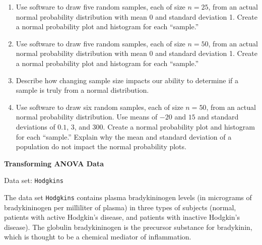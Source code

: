 \documentclass[
]{report}
\begin{document}
\begin{list}{E..}{ \setlength{\itemsep}{1.2em}}
    \begin{enumerate}
      \item Use software to draw five random samples, each of size $n = 25$, from an actual normal probability distribution with mean 0 and standard deviation 1. Create a normal probability plot and histogram for each “sample.”
      \item Use software to draw five random samples, each of size $n = 50$, from an actual normal probability distribution with mean 0 and standard deviation 1. Create a normal probability plot and histogram for each “sample.”
      \item Describe how changing sample size impacts our ability to determine if a sample is truly from a normal distribution.
      \item Use software to draw six random samples, each of size $n = 50$, from an actual normal probability distribution. Use means of $-20$ and $15$ and standard deviations of $0.1$, $3$, and $300$. Create a normal probability plot and histogram for each “sample.” Explain why the mean and standard deviation of a population do not impact the normal probability plots.
    \end{enumerate}

  \item \textbf{Transforming ANOVA Data}

Data set: \texttt{Hodgkins}

The data set \texttt{Hodgkins} contains plasma bradykininogen levels (in micrograms of bradykininogen per milliliter of plasma) in three types of subjects (normal, patients with active Hodgkin’s disease, and patients with inactive Hodgkin’s disease). The globulin bradykininogen is the precursor substance for bradykinin, which is thought to be a chemical mediator of inflammation.


\end{list}
\end{document}
